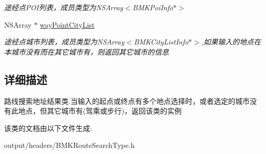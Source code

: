 \begin{DoxyCompactItemize}
\begin{DoxyCompactList}\small\item\em 途经点\+P\+O\+I列表，成员类型为\+N\+S\+Array$<$\+B\+M\+K\+Poi\+Info$\ast$$>$ \end{DoxyCompactList}\item 
\hypertarget{interface_b_m_k_suggest_addr_info_a3eeadb7f0eaaa514391a7f9565e9029a}{}N\+S\+Array $\ast$ \hyperlink{interface_b_m_k_suggest_addr_info_a3eeadb7f0eaaa514391a7f9565e9029a}{way\+Point\+City\+List}\label{interface_b_m_k_suggest_addr_info_a3eeadb7f0eaaa514391a7f9565e9029a}

\begin{DoxyCompactList}\small\item\em 途经点城市列表，成员类型为\+N\+S\+Array$<$\+B\+M\+K\+City\+List\+Info$\ast$$>$,如果输入的地点在本城市没有而在其它城市有，则返回其它城市的信息 \end{DoxyCompactList}\end{DoxyCompactItemize}


\subsection{详细描述}
路线搜索地址结果类.\+当输入的起点或终点有多个地点选择时，或者选定的城市没有此地点，但其它城市有(驾乘或步行)，返回该类的实例 

该类的文档由以下文件生成\+:\begin{DoxyCompactItemize}
\item 
output/headers/B\+M\+K\+Route\+Search\+Type.\+h\end{DoxyCompactItemize}
